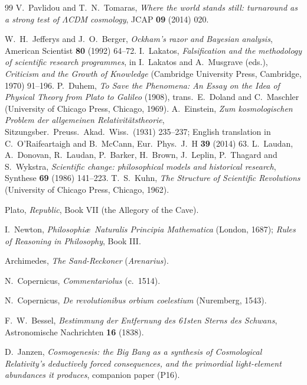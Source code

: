 \documentclass[11pt,a4paper]{article}
\begin{document}
\begin{thebibliography}{99}
 V.~Pavlidou and T.~N.~Tomaras, \emph{Where the world stands still: turnaround as a strong test of $\Lambda$CDM cosmology}, JCAP \textbf{09} (2014) 020.

 W.~H.~Jefferys and J.~O.~Berger, \emph{Ockham's razor and Bayesian analysis}, American Scientist \textbf{80} (1992) 64--72.
 I.~Lakatos, \emph{Falsification and the methodology of scientific research programmes}, in I.~Lakatos and A.~Musgrave (eds.), \emph{Criticism and the Growth of Knowledge} (Cambridge University Press, Cambridge, 1970) 91--196.
 P.~Duhem, \emph{To Save the Phenomena: An Essay on the Idea of Physical Theory from Plato to Galileo} (1908), trans.\ E.~Doland and C.~Maschler (University of Chicago Press, Chicago, 1969).
 A.~Einstein, \emph{Zum kosmologischen Problem der allgemeinen Relativit\"atstheorie}, Sitzungsber.\ Preuss.\ Akad.\ Wiss.\ (1931) 235--237; English translation in C.~O'Raifeartaigh and B.~McCann, Eur.\ Phys.\ J.~H \textbf{39} (2014) 63.
 L.~Laudan, A.~Donovan, R.~Laudan, P.~Barker, H.~Brown, J.~Leplin, P.~Thagard and S.~Wykstra, \emph{Scientific change: philosophical models and historical research}, Synthese \textbf{69} (1986) 141--223.
T.~S.~Kuhn,
\emph{The Structure of Scientific Revolutions}
(University of Chicago Press, Chicago, 1962).

Plato,
\emph{Republic}, Book VII (the Allegory of the Cave).

I.~Newton,
\emph{Philosophi\ae\ Naturalis Principia Mathematica} (London, 1687);
\emph{Rules of Reasoning in Philosophy}, Book III.

Archimedes,
\emph{The Sand-Reckoner} (\emph{Arenarius}).

N.~Copernicus,
\emph{Commentariolus} (c.~1514).

N.~Copernicus,
\emph{De revolutionibus orbium coelestium} (Nuremberg, 1543).

F.~W.~Bessel,
\emph{Bestimmung der Entfernung des 61sten Sterns des Schwans},
Astronomische Nachrichten \textbf{16} (1838).

 D.~Janzen, \emph{Cosmogenesis: the Big Bang as a synthesis of Cosmological Relativity's deductively forced consequences, and the primordial light-element abundances it produces}, companion paper (P16).


\end{thebibliography}
\end{document}
